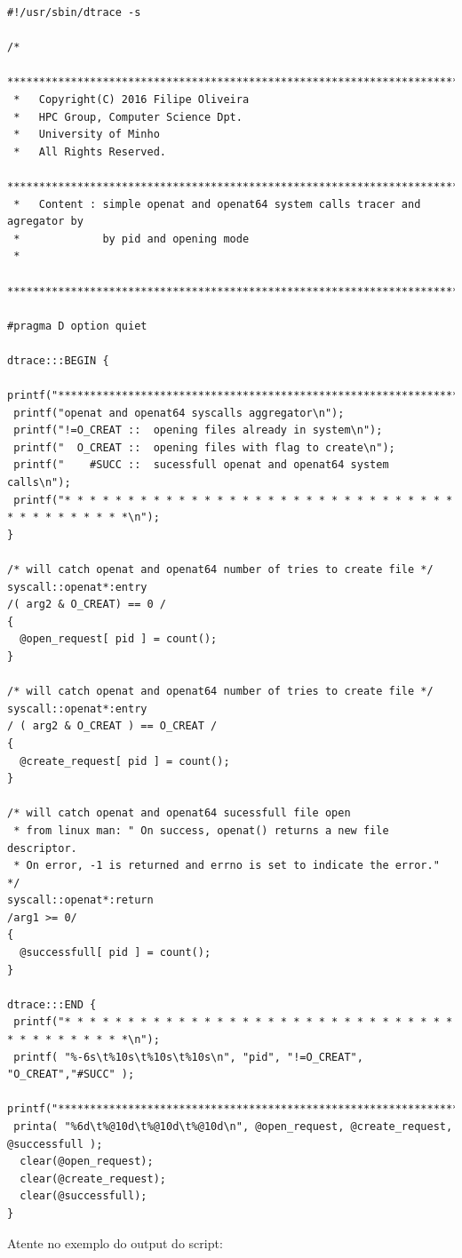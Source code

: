 \documentclass[a4paper]{article}
\begin{document}
\begin{lstlisting}
#!/usr/sbin/dtrace -s

/*
 ********************************************************************************
 *   Copyright(C) 2016 Filipe Oliveira
 *   HPC Group, Computer Science Dpt.
 *   University of Minho
 *   All Rights Reserved.
 ********************************************************************************
 *   Content : simple openat and openat64 system calls tracer and agregator by
 *             by pid and opening mode
 *     
 ********************************************************************************/

#pragma D option quiet
 
dtrace:::BEGIN {
 printf("*********************************************************************************\n");
 printf("openat and openat64 syscalls aggregator\n");
 printf("!=O_CREAT ::  opening files already in system\n");
 printf("  O_CREAT ::  opening files with flag to create\n"); 
 printf("    #SUCC ::  sucessfull openat and openat64 system calls\n");
 printf("* * * * * * * * * * * * * * * * * * * * * * * * * * * * * * * * * * * * * * * * *\n");
}

/* will catch openat and openat64 number of tries to create file */
syscall::openat*:entry 
/( arg2 & O_CREAT) == 0 /
{
  @open_request[ pid ] = count();
}

/* will catch openat and openat64 number of tries to create file */
syscall::openat*:entry 
/ ( arg2 & O_CREAT ) == O_CREAT /
{
  @create_request[ pid ] = count();
}

/* will catch openat and openat64 sucessfull file open
 * from linux man: " On success, openat() returns a new file descriptor. 
 * On error, -1 is returned and errno is set to indicate the error."  */
syscall::openat*:return
/arg1 >= 0/
{
  @successfull[ pid ] = count();
}

dtrace:::END {
 printf("* * * * * * * * * * * * * * * * * * * * * * * * * * * * * * * * * * * * * * * * *\n");
 printf( "%-6s\t%10s\t%10s\t%10s\n", "pid", "!=O_CREAT", "O_CREAT","#SUCC" );
 printf("*********************************************************************************\n");
 printa( "%6d\t%@10d\t%@10d\t%@10d\n", @open_request, @create_request, @successfull );
  clear(@open_request);
  clear(@create_request);
  clear(@successfull);
}
 \end{lstlisting}

Atente no exemplo do output do script:
\end{document}
